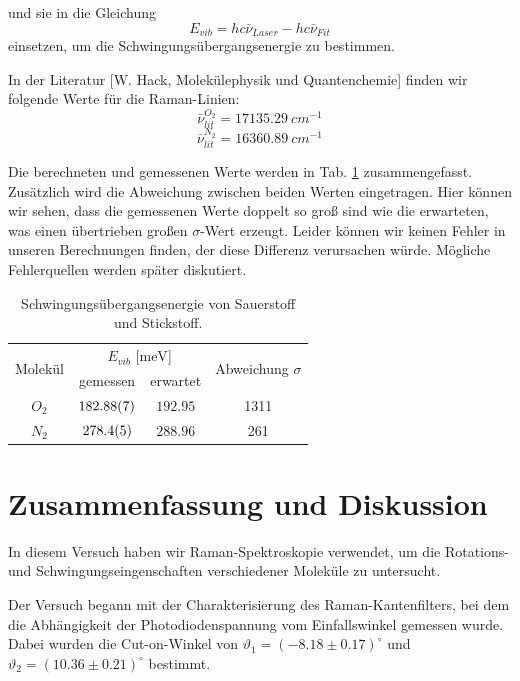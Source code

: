 \documentclass[11pt]{article}
\begin{document}
und sie in die Gleichung
\begin{equation}
E_{vib} = hc\bar{\nu}_{Laser} - hc\bar{\nu}_{Fit}
\end{equation}
einsetzen, um die Schwingungsübergangsenergie zu bestimmen.

In der Literatur [W. Hack, Molekülephysik und Quantenchemie] finden wir folgende Werte für die Raman-Linien:
$$\bar{\nu}^{O_2}_{lit} = \SI{17135.29}{cm^{-1}}$$
$$\bar{\nu}^{N_2}_{lit} = \SI{16360.89}{cm^{-1}}$$

Die berechneten und gemessenen Werte werden in Tab. \ref{tab:N_O} zusammengefasst. Zusätzlich wird die Abweichung zwischen beiden Werten eingetragen. Hier können wir sehen, dass die gemessenen Werte doppelt so groß sind wie die erwarteten, was einen übertrieben großen $\sigma$-Wert erzeugt. Leider können wir keinen Fehler in unseren Berechnungen finden, der diese Differenz verursachen würde. Mögliche Fehlerquellen werden später diskutiert.

\begin{table}[!htbp]
 \begin{center}
  \caption{ \small Schwingungsübergangsenergie von Sauerstoff und Stickstoff.}
  \label{tab:N_O}
  \renewcommand{\arraystretch}{1.3}
  \begin{tabular}{|c|c|c|c|}
  \hline

\multirow{2}{*}{Molekül}& \multicolumn{2}{c|}{$E_{vib}$ [$\unit{\milli\electronvolt}$]} &  \multirow{2}{*}{ Abweichung $\sigma$} \\ \cline{2-3} %
 					 & gemessen & erwartet &    			\\
  \hline
  \hline
  $O_2$	&	$\num{182.88 \pm 0.07}$	&	$\num{192.95}$ &	1311\\
  $N_2$	&	$\num{278.4 \pm 0.5}$	&	$\num{288.96}$&	261\\ 
  \hline
  \end{tabular}
  \renewcommand{\arraystretch}{1}
 \end{center}
\end{table}

\section{Zusammenfassung und Diskussion}
In diesem Versuch haben wir Raman-Spektroskopie verwendet, um die Rotations- und Schwingungseingenschaften verschiedener Moleküle zu untersucht.

Der Versuch begann mit der Charakterisierung des Raman-Kantenfilters, bei dem die Abhängigkeit der Photodiodenspannung vom Einfallswinkel gemessen wurde. Dabei wurden die Cut-on-Winkel von $\vartheta_1 = \left(-8.18\pm 0.17\right)^\circ$ und $\vartheta_2 =\left(10.36\pm 0.21\right)^\circ$ bestimmt. 
\end{document}
